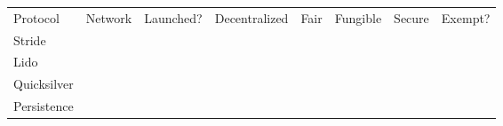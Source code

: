 \begin{table}[]
  \begin{tabular}{llllllll}
  Protocol          & Network & Launched? & Decentralized & Fair & Fungible & Secure & Exempt? \\
  Stride            &         &           &               &      &          &        &         \\
  Lido              &         &           &               &      &          &        &         \\
  Quicksilver       &         &           &               &      &          &        &         \\
  Persistence       &         &           &               &      &          &        &        
  \end{tabular}
\end{table}